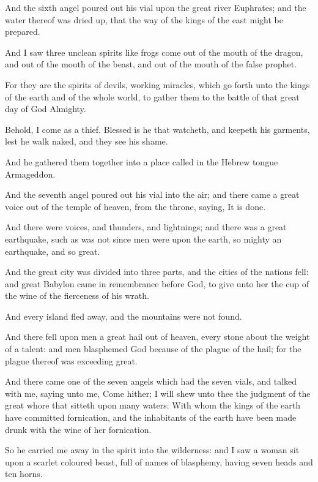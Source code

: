 \Verse And the sixth angel poured out his vial upon the great river Euphrates; and the water thereof was dried up, that the way of the kings of the east might be prepared.

\Verse And I saw three unclean spirits like frogs come out of the mouth of the dragon, and out of the mouth of the beast, and out of the mouth of the false prophet.

\Verse For they are the spirits of devils, working miracles, which go forth unto the kings of the earth and of the whole world, to gather them to the battle of that great day of God Almighty.

\Verse Behold, I come as a thief. Blessed is he that watcheth, and keepeth his garments, lest he walk naked, and they see his shame.

\Verse And he gathered them together into a place called in the Hebrew tongue Armageddon.

\Verse And the seventh angel poured out his vial into the air; and there came a great voice out of the temple of heaven, from the throne, saying, It is done.

\Verse And there were voices, and thunders, and lightnings; and there was a great earthquake, such as was not since men were upon the earth, so mighty an earthquake, and so great.

\Verse And the great city was divided into three parts, and the cities of the nations fell: and great Babylon came in remembrance before God, to give unto her the cup of the wine of the fierceness of his wrath.

\Verse And every island fled away, and the mountains were not found.

\Verse And there fell upon men a great hail out of heaven, every stone about the weight of a talent: and men blasphemed God because of the plague of the hail; for the plague thereof was exceeding great.

\Chapter
\Verse And there came one of the seven angels which had the seven vials, and talked with me, saying unto me, Come hither; I will shew unto thee the judgment of the great whore that sitteth upon many waters: \Verse With whom the kings of the earth have committed fornication, and the inhabitants of the earth have been made drunk with the wine of her fornication.

\Verse So he carried me away in the spirit into the wilderness: and I saw a woman sit upon a scarlet coloured beast, full of names of blasphemy, having seven heads and ten horns.

